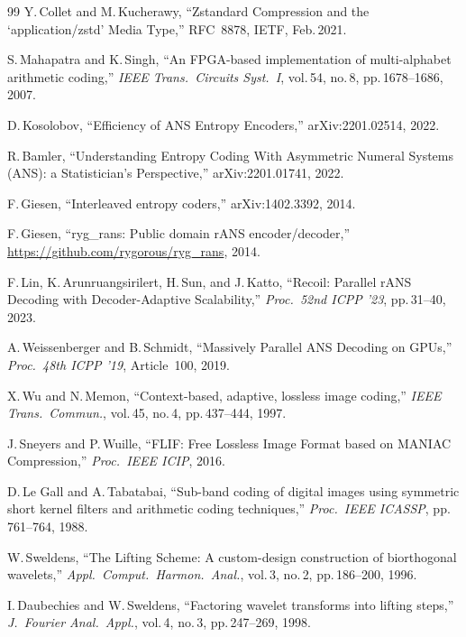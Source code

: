 \documentclass[journal]{IEEEtran}
\begin{document}
\begin{thebibliography}{99}
Y.\,Collet and M.\,Kucherawy,
``Zstandard Compression and the `application/zstd' Media Type,''
RFC~8878, IETF, Feb.\,2021.


S.\,Mahapatra and K.\,Singh,
``An FPGA-based implementation of multi-alphabet arithmetic coding,''
\textit{IEEE Trans.\ Circuits Syst.\ I}, vol.\,54, no.\,8, pp.\,1678--1686,
2007.

D.\,Kosolobov, ``Efficiency of ANS Entropy Encoders,''
arXiv:2201.02514, 2022.

R.\,Bamler, ``Understanding Entropy Coding With Asymmetric Numeral Systems
(ANS): a Statistician's Perspective,'' arXiv:2201.01741, 2022.

F.\,Giesen, ``Interleaved entropy coders,'' arXiv:1402.3392, 2014.

F.\,Giesen, ``ryg\_rans: Public domain rANS encoder/decoder,''
\url{https://github.com/rygorous/ryg_rans}, 2014.

F.\,Lin, K.\,Arunruangsirilert, H.\,Sun, and J.\,Katto,
``Recoil: Parallel rANS Decoding with Decoder-Adaptive Scalability,''
\textit{Proc.\ 52nd ICPP '23}, pp.\,31--40, 2023.

A.\,Weissenberger and B.\,Schmidt,
``Massively Parallel ANS Decoding on GPUs,''
\textit{Proc.\ 48th ICPP '19}, Article~100, 2019.

X.\,Wu and N.\,Memon,
``Context-based, adaptive, lossless image coding,''
\textit{IEEE Trans.\ Commun.}, vol.\,45, no.\,4, pp.\,437--444, 1997.

J.\,Sneyers and P.\,Wuille,
``FLIF: Free Lossless Image Format based on MANIAC Compression,''
\textit{Proc.\ IEEE ICIP}, 2016.

D.\,Le Gall and A.\,Tabatabai,
``Sub-band coding of digital images using symmetric short kernel filters and
arithmetic coding techniques,'' \textit{Proc.\ IEEE ICASSP}, pp.\,761--764,
1988.

W.\,Sweldens,
``The Lifting Scheme: A custom-design construction of biorthogonal wavelets,''
\textit{Appl.\ Comput.\ Harmon.\ Anal.}, vol.\,3, no.\,2, pp.\,186--200, 1996.

I.\,Daubechies and W.\,Sweldens,
``Factoring wavelet transforms into lifting steps,''
\textit{J.\ Fourier Anal.\ Appl.}, vol.\,4, no.\,3, pp.\,247--269, 1998.


\end{thebibliography}
\end{document}
